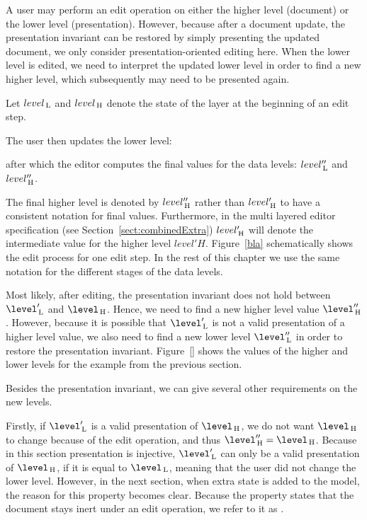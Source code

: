 A user may perform an edit operation on either the higher level (document) or the lower level (presentation). However, because after a document update, the presentation invariant can be restored by simply presenting the updated document, we only consider presentation-oriented editing here. When the lower level is edited, we need to interpret the updated lower level in order to find a new higher level, which subsequently may need to be presented again.


Let $level_{\, \mathrm L}$ and $level_{\, \mathrm H}$ denote the state of the layer at the beginning of an edit step. 


The user then updates the lower level:


after which the editor computes the final values for the data levels: $level''_{\, \mathrm L}$ and $level''_{\, \mathrm H}$.

The final higher level is denoted by $level''_{\, \mathrm H}$ rather than $level'_{\, \mathrm H}$ to have a consistent notation for final values. Furthermore, in the multi layered editor specification (see Section~\ref{sect:combinedExtra}) $level'_{\, \mathrm H}$ will denote the intermediate value for the higher level $level'H$. Figure~\ref{bla} schematically shows the edit process for one edit step. In the rest of this chapter we use the same notation for the different stages of the data levels.


Most likely, after editing, the presentation invariant does not hold between $\level'\L$ and $\level\H$. Hence, we need to find a new higher level value $\level''\H$. However, because it is possible that $\level'\L$ is not a valid presentation of a higher level value, we also need to find a new lower level $\level''\L$ in order to restore the presentation invariant. Figure~\ref{} shows the values of the higher and lower levels for the example from the previous section.

Besides the presentation invariant, we can give several other requirements on the new levels.

Firstly, if $\level'\L$ is a valid presentation of $\level\H$, we do not want $\level\H$ to change because of the edit operation, and thus $\level''\H = \level\H$. Because in this section presentation is injective, $\level'\L$ can only be a valid presentation of $\level\H$, if it is equal to $\level\L$, meaning that the user did not change the lower level. However, in the next section, when extra state is added to the model, the reason for this property becomes clear. Because the property states that the document stays inert under an edit operation, we refer to it as .

